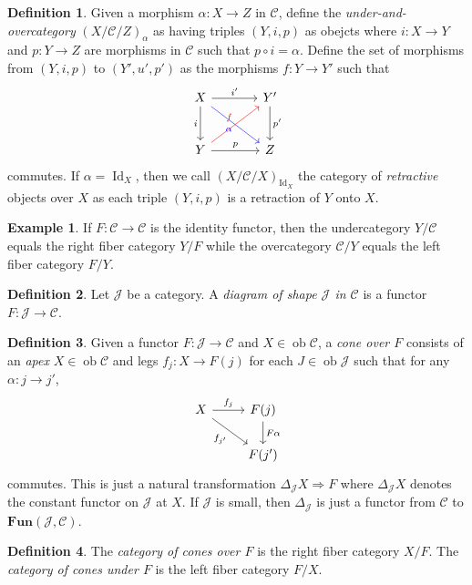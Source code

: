 \documentclass[10pt,letterpaper,cm]{nupset}
\theoremstyle{definition}
\newtheorem*{definition}{Definition}
\newtheorem{exmp}{Example}
\newcommand{\1}{\mathbf{1}}
\renewcommand{\c}{\mathscr{C}}
\renewcommand{\j}{\mathscr{J}}
\newcommand{\0}{\vec 0}
\DeclareMathOperator{\id}{Id}
\DeclareMathOperator{\ob}{ob}
\begin{document}
\begin{definition}
Given a morphism $\alpha : X \to Z$ in $\c$, define the \textit{under-and-overcategory} $(X/\c/Z)_{\alpha}$ as having triples $(Y, i, p)$ as obejcts where $i : X \to Y$ and $p: Y \to Z$ are morphisms in $\c$ such that $p\circ i = \alpha$. Define the set of morphisms from $(Y, i, p)$ to $(Y', u', p')$ as the morphisms $f: Y \to Y'$ such that 
\[
\begin{tikzcd}[row sep=large, column sep=large]
X \arrow[to=Z, "i ", swap] \arrow[to=2-2, dr, blue, "\alpha", swap]
& Y' \arrow[to=2-2, "p' "] \\
|[alias=Z]| Y \arrow[to=1-2, ur, red, "f"] \arrow[to=2-2, "p"] 
& Z
\arrow[from=ul, to=1-2, "i' "]
\end{tikzcd}
\]
commutes. If $\alpha = \id_X$, then we call $(X/\c/X)_{\id_X}$ the category of \textit{retractive} objects over $X$ as each triple $(Y, i, p)$ is a retraction of $Y$ onto $X$.
\end{definition}

\begin{exmp}
If $F: \c \to \c$ is the identity functor, then the undercategory $Y/\c$ equals the right fiber category $Y/F$ while the overcategory $\c/Y$ equals the left fiber category $F/Y$.
\end{exmp}

\begin{definition}
Let $\j$ be a category. A \textit{diagram of shape $\j$ in $\c$} is a functor $F: \j \to \c$.
\end{definition}

\begin{definition}
Given a functor $F: \j \to \c$ and $X \in \ob \c$, a \textit{cone over $F$} consists of an \textit{apex} $X\in \ob \c$ and legs $f_j : X \to F(j)$ for each $J \in \ob \j$ such that for any $\alpha : j \to j'$, 
\[ \begin{tikzcd}
X \arrow[r, "f_j"] \arrow[swap, dr,  " f_{j'} "] & F(j) \arrow[d, "F\alpha"] \\%
 & F(j')
\end{tikzcd}
\]
commutes. This is just a natural transformation $\Delta_{\j} X \Rightarrow F$ where $\Delta_{\j} X$ denotes the constant functor on $\j$ at $X$. If $\j$ is small, then $\Delta_{\j}$ is just a functor from $\c$ to $\mathbf{Fun}(\j, \c)$.
\end{definition}

\begin{definition}
The \textit{category of cones over $F$} is the right fiber category $X/F$. The \textit{category of cones under $F$} is the left fiber category  $F/X$.
\end{definition}
\end{document}
